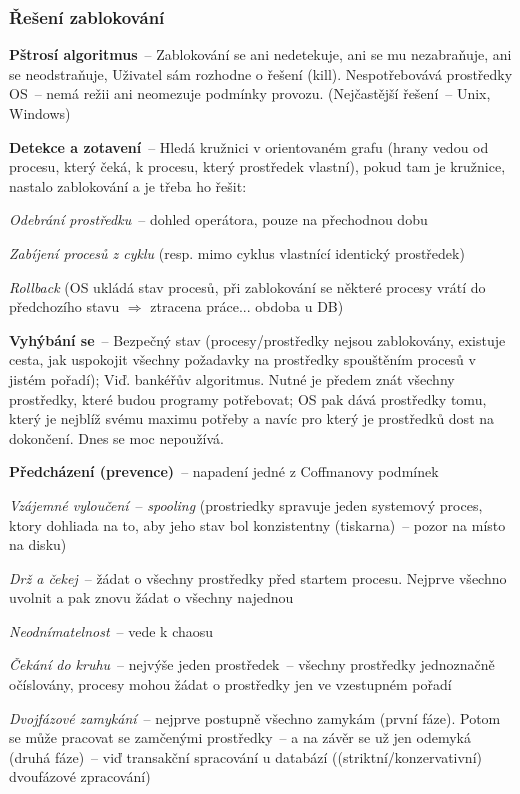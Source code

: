 \subsubsection*{Řešení zablokování}
\begin{pitemize}
	\item \textbf{Pštrosí algoritmus}~-- Zablokování se ani nedetekuje, ani se mu nezabraňuje, ani se neodstraňuje, Uživatel sám rozhodne o řešení (kill). Nespotřebovává prostředky OS~-- nemá režii ani neomezuje podmínky provozu. (Nejčastější řešení~-- Unix, Windows) 
	\item \textbf{Detekce a zotavení}~-- Hledá kružnici v orientovaném grafu (hrany vedou od procesu, který čeká, k procesu, který prostředek vlastní), pokud tam je kružnice, nastalo zablokování a je třeba ho řešit:
		\begin{pitemize}
			\item \emph{Odebrání prostředku}~-- dohled operátora, pouze na přechodnou dobu
			\item \emph{Zabíjení procesů z cyklu} (resp. mimo cyklus vlastnící identický prostředek)
			\item \emph{Rollback} (OS ukládá stav procesů, při zablokování se některé procesy vrátí do předchozího stavu $\Rightarrow$ ztracena práce... obdoba u DB)
		\end{pitemize}
	\item \textbf{Vyhýbání se}~-- Bezpečný stav (procesy/prostředky nejsou zablokovány, existuje cesta, jak uspokojit všechny požadavky na prostředky spouštěním procesů v jistém pořadí); Viď. bankéřův algoritmus. Nutné je předem znát všechny prostředky, které budou programy potřebovat; OS pak dává prostředky tomu, který je nejblíž svému maximu potřeby a navíc pro který je prostředků dost na dokončení. Dnes se moc nepoužívá.
	\item \textbf{Předcházení (prevence)}~-- napadení jedné z Coffmanovy podmínek
		\begin{penumerate}
			\item \emph{Vzájemné vyloučení}~-- \emph{spooling} (prostriedky spravuje jeden systemový proces, ktory dohliada na to, aby jeho stav bol konzistentny (tiskarna)~-- pozor na místo na disku)
			\item \emph{Drž a čekej}~-- žádat o všechny prostředky před startem procesu. Nejprve všechno uvolnit a pak znovu žádat o všechny najednou
			\item \emph{Neodnímatelnost}~-- vede k chaosu
			\item \emph{Čekání do kruhu}~-- nejvýše jeden prostředek~-- všechny prostředky jednoznačně očíslovány, procesy mohou žádat o prostředky jen ve vzestupném pořadí

		\end{penumerate}
			\item \emph{Dvojfázové zamykání}~-- nejprve postupně všechno zamykám (první fáze). Potom se může pracovat se zamčenými prostředky~-- a na závěr se už jen odemyká (druhá fáze)~-- viď transakční spracování u databází ((striktní/konzervativní) dvoufázové zpracování)
\end{pitemize}

